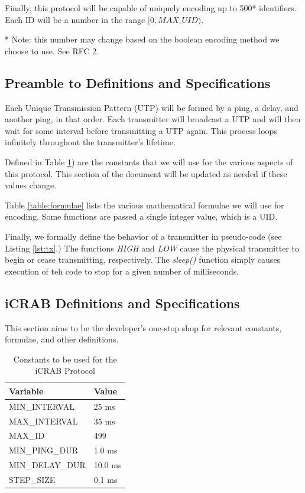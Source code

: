 \documentclass[12pt]{article}
\begin{document}
Finally, this protocol will be capable of uniquely encoding up to 500*
identifiers.
Each ID will be a number in the range $[0, MAX\_UID)$.

* Note: this number may change based on the boolean encoding method we choose
to use. See RFC 2.

\subsection{Preamble to Definitions and Specifications} \label{preamble}

Each Unique Transmission Pattern (UTP) will be formed by a ping, a delay,
and another ping, in that order.
Each transmitter will broadcast a UTP and will then wait for some interval
before transmitting a UTP again.
This process loops infinitely throughout the transmitter's lifetime.

Defined in Table \ref{table:constants}) are the constants that we will use for
the various aspects of this protocol.
This section of the document will be updated as needed if these values
change.

Table \ref{table:formulae} lists the various mathematical formulae we will
use for encoding.
Some functions are passed a single integer value, which is a UID.

Finally, we formally define the behavior of a transmitter in pseudo-code
(see Listing \ref{lst:tx}.)
The functions {\em HIGH} and {\em LOW} cause the physical transmitter to begin
or cease transmitting, respectively.
The {\em sleep()} function simply causes execution of teh code to stop for a
given number of milliseconds.

\newpage
\subsection{iCRAB Definitions and Specifications} \label{specs}

This section aims to be the developer's one-stop shop for relevant constants,
formulae, and other definitions.

\begin{table}[ht]
\centering
\begin{tabular}{|l|l|}
\hline
Variable & Value \\
\hline
MIN\_INTERVAL	&	25 ms	\\
MAX\_INTERVAL	&	35 ms	\\
MAX\_ID			&	499		\\
MIN\_PING\_DUR	&	1.0 ms	\\
MIN\_DELAY\_DUR	&	10.0 ms	\\
STEP\_SIZE		&	0.1	ms	\\
\hline
\end{tabular}
\caption{Constants to be used for the iCRAB Protocol}\label{table:constants}
\end{table}
\end{document}

